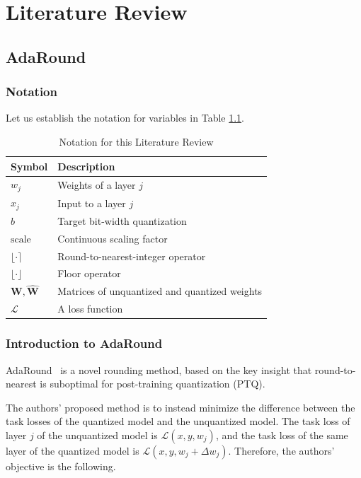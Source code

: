 \documentclass[../main.tex]{subfiles}
\begin{document}
\chapter{Literature Review} \label{chap:lit_review}
\section{AdaRound}
\subsection{Notation}
Let us establish the notation for variables in Table \ref{tab:adaround_notation}.

\begin{table}[H]
\centering
\caption{Notation for this Literature Review}
\label{tab:adaround_notation}
\begin{tabular}{ll}
\hline
\textbf{Symbol} & \textbf{Description} \\ \hline
$w_j$             & Weights of a layer $j$ \\
$x_j$             & Input to a layer $j$ \\
$b$             & Target bit-width quantization \\
$\text{scale}$  & Continuous scaling factor \\
$\lfloor \cdot \rceil$ & Round-to-nearest-integer operator \\
$\lfloor \cdot \rfloor$ & Floor operator \\
$\mathbf{W}, \hat{\mathbf{W}}$    & Matrices of unquantized and quantized weights \\
$\mathcal{L}$ & A loss function \\
\hline
\end{tabular}
\end{table}

\subsection{Introduction to AdaRound}
AdaRound~\cite{nagelAdaptiveRoundingPostTraining2020a} is a novel rounding method, based on the key insight that round-to-nearest is suboptimal for post-training quantization (PTQ).

The authors' proposed method is to instead minimize the difference between the task losses of the quantized model and the unquantized model. The task loss of layer $j$ of the unquantized model is $\mathcal{L}(x, y, w_j)$, and the task loss of the same layer of the quantized model is $\mathcal{L}(x, y, w_j + \Delta w_j)$. Therefore, the authors' objective is the following.
\end{document}
